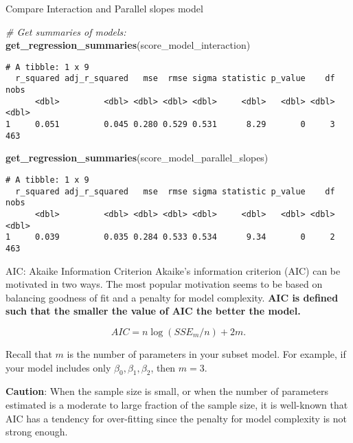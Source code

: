 \documentclass[
  ignorenonframetext,
]{beamer}
\newenvironment{Shaded}{\begin{snugshade}}{\end{snugshade}}
\newcommand{\CommentTok}[1]{\textcolor[rgb]{0.56,0.35,0.01}{\textit{#1}}}
\newcommand{\FunctionTok}[1]{\textcolor[rgb]{0.13,0.29,0.53}{\textbf{#1}}}
\newcommand{\NormalTok}[1]{#1}
\begin{document}
\begin{frame}[fragile]{Compare Interaction and Parallel slopes model}
\protect\hypertarget{compare-interaction-and-parallel-slopes-model-2}{}
\footnotesize

\begin{Shaded}
\begin{Highlighting}[]
\CommentTok{\# Get summaries of models:}
\FunctionTok{get\_regression\_summaries}\NormalTok{(score\_model\_interaction)}
\end{Highlighting}
\end{Shaded}

\begin{verbatim}
# A tibble: 1 x 9
  r_squared adj_r_squared   mse  rmse sigma statistic p_value    df  nobs
      <dbl>         <dbl> <dbl> <dbl> <dbl>     <dbl>   <dbl> <dbl> <dbl>
1     0.051         0.045 0.280 0.529 0.531      8.29       0     3   463
\end{verbatim}

\begin{Shaded}
\begin{Highlighting}[]
\FunctionTok{get\_regression\_summaries}\NormalTok{(score\_model\_parallel\_slopes)}
\end{Highlighting}
\end{Shaded}

\begin{verbatim}
# A tibble: 1 x 9
  r_squared adj_r_squared   mse  rmse sigma statistic p_value    df  nobs
      <dbl>         <dbl> <dbl> <dbl> <dbl>     <dbl>   <dbl> <dbl> <dbl>
1     0.039         0.035 0.284 0.533 0.534      9.34       0     2   463
\end{verbatim}

\normalsize
\end{frame}

\begin{frame}{AIC: Akaike Information Criterion}
\protect\hypertarget{aic-akaike-information-criterion}{}
Akaike's information criterion (AIC) can be motivated in two ways. The
most popular motivation seems to be based on balancing goodness of fit
and a penalty for model complexity. \textbf{AIC is defined such that the
smaller the value of AIC the better the model.}

\[AIC=n\log(SSE_{m}/n)+2m.\]

Recall that \(m\) is the number of parameters in your subset model. For
example, if your model includes only \(\beta_0, \beta_1, \beta_2\), then
\(m = 3\).

\textbf{Caution}: When the sample size is small, or when the number of
parameters estimated is a moderate to large fraction of the sample size,
it is well-known that AIC has a tendency for over-fitting since the
penalty for model complexity is not strong enough.
\end{frame}
\end{document}
